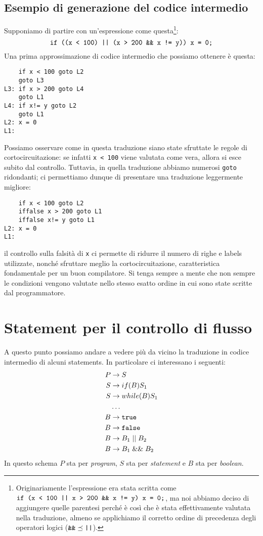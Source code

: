 \documentclass[class=book, crop=false, oneside, 12pt]{standalone}
\begin{document}
\subsection{Esempio di generazione del codice intermedio}
Supponiamo di partire con un'espressione come questa\footnote{Originariamente l'espressione era stata scritta come \(\textrm{\texttt{if (x < 100 || x > 200 \&\& x != y) x = 0;}}\), ma noi abbiamo deciso di aggiungere quelle parentesi perché è così che è stata effettivamente valutata nella traduzione, almeno se applichiamo il corretto ordine di precedenza degli operatori logici (\(\textrm{\texttt{\&\&}} \preceq \textrm{\texttt{||}}\)).}:
\begin{equation*}
    \textrm{\texttt{if ((x < 100) || (x > 200 \&\& x != y)) x = 0;}}
\end{equation*}
Una prima approssimazione di codice intermedio che possiamo ottenere è questa:
\begin{verbatim}
    if x < 100 goto L2
    goto L3
L3: if x > 200 goto L4
    goto L1
L4: if x!= y goto L2
    goto L1
L2: x = 0
L1:
\end{verbatim}
Possiamo osservare come in questa traduzione siano state sfruttate le regole di cortocircuitazione: se infatti \texttt{x < 100} viene valutata come vera, allora si esce subito dal controllo. Tuttavia, in quella traduzione abbiamo numerosi \texttt{goto} ridondanti; ci permettiamo dunque di presentare una traduzione leggermente migliore:
\begin{verbatim}
    if x < 100 goto L2
    iffalse x > 200 goto L1
    iffalse x!= y goto L1   
L2: x = 0
L1:
\end{verbatim}
il controllo sulla falsità di \texttt{x} ci permette di ridurre il numero di righe e labels utilizzate, nonché sfruttare meglio la cortocircuitazione, caratteristica fondamentale per un buon compilatore. Si tenga sempre a mente che non sempre le condizioni vengono valutate nello stesso esatto ordine in cui sono state scritte dal programmatore.

\section{Statement per il controllo di flusso}
A questo punto possiamo andare a vedere più da vicino la traduzione in codice intermedio di alcuni statements. In particolare ci interessano i seguenti:
\begin{align*}
    P &\to S \\
    S &\to if (B) S_1 \\
    S &\to while (B) S_1 \\
    &\ldots \\
    B &\to \textrm{\texttt{true}} \\
    B &\to \textrm{\texttt{false}} \\
    B &\to B_1\; ||\; B_2 \\
    B &\to B_1\; \&\&\; B_2
\end{align*}
In questo schema \(P\) sta per \emph{program}, \(S\) sta per \emph{statement} e \(B\) sta per \emph{boolean}.
\end{document}
